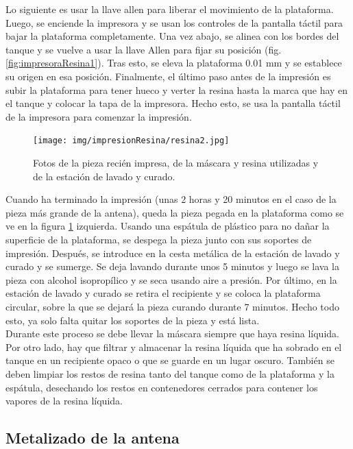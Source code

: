 \documentclass[11pt,a4paper,twoside,pdf]{article}
\numberwithin{equation}{section}
\begin{document}
Lo siguiente es usar la llave allen para liberar el movimiento de la plataforma. Luego, se enciende la impresora y se usan los controles de la pantalla táctil para bajar la plataforma completamente. Una vez abajo, se alinea con los bordes del tanque y se vuelve a usar la llave Allen para fijar su posición (fig. \ref{fig:impresoraResina1}). Tras esto, se eleva la plataforma 0.01 mm y se establece su origen en esa posición. Finalmente, el último paso antes de la impresión es subir la plataforma para tener hueco y verter la resina hasta la marca que hay en el tanque y colocar la tapa de la impresora. Hecho esto, se usa la pantalla táctil de la impresora para comenzar la impresión.
\begin{figure}
    \centering
    \texttt{[image: img/impresionResina/resina2.jpg]}
    \vspace{-0.65cm}
    \caption{Fotos de la pieza recién impresa, de la máscara y resina utilizadas y de la estación de lavado y curado.}
    \label{fig:impresoraResina2}
\end{figure}

Cuando ha terminado la impresión (unas 2 horas y 20 minutos en el caso de la pieza más grande de la antena), queda la pieza pegada en la plataforma como se ve en la figura \ref{fig:impresoraResina2} izquierda. Usando una espátula de plástico para no dañar la superficie de la plataforma, se despega la pieza junto con sus soportes de impresión. Después, se introduce en la cesta metálica de la estación de lavado y curado y se sumerge. Se deja lavando durante unos 5 minutos y luego se lava la pieza con alcohol isopropílico y se seca usando aire a presión. Por último, en la estación de lavado y curado se retira el recipiente y se coloca la plataforma circular, sobre la que se dejará la pieza curando durante 7 minutos. Hecho todo esto, ya solo falta quitar los soportes de la pieza y está lista.\\

Durante este proceso se debe llevar la máscara siempre que haya resina líquida. Por otro lado, hay que filtrar y almacenar la resina líquida que ha sobrado en el tanque en un recipiente opaco o que se guarde en un lugar oscuro. También se deben limpiar los restos de resina tanto del tanque como de la plataforma y la espátula, desechando los restos en contenedores cerrados para contener los vapores de la resina líquida.


\subsection{Metalizado de la antena}
\end{document}
